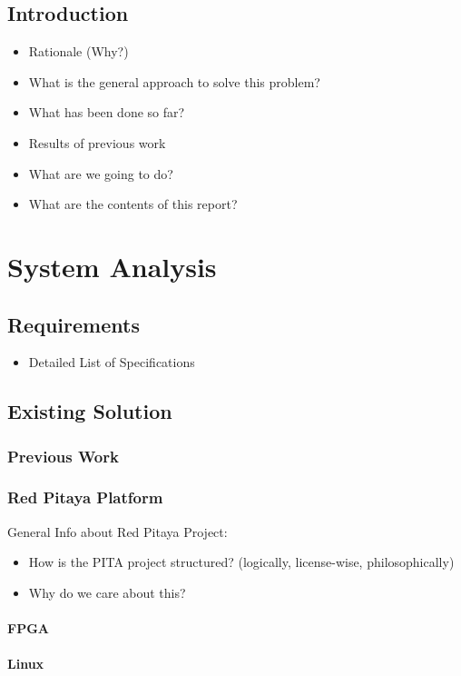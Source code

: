 \documentclass[a4paper,oneside]{alpenthesis/alpenthesis}
\begin{document}
\tableofcontents*

\chapter{Introduction}
\begin{itemize}\firmlist
    \item Rationale (Why?)
    \item What is the general approach to solve this problem?
    \item What has been done so far?
    \item Results of previous work
    \item What are we going to do?
    \item What are the contents of this report?
\end{itemize}

\part{System Analysis}
\chapter{Requirements}
\begin{itemize}\firmlist
    \item Detailed List of Specifications
\end{itemize}

\chapter{Existing Solution}
\section{Previous Work}
\section{Red Pitaya Platform}
General Info about Red Pitaya Project:
\begin{itemize}\firmlist
    \item How is the PITA project structured? (logically, license-wise, philosophically)
    \item Why do we care about this?
\end{itemize}
\subsection{FPGA}
\subsection{Linux}
\end{document}
